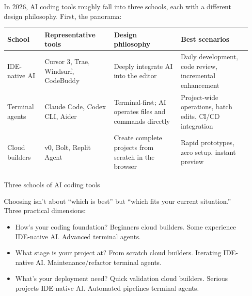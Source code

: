 


In 2026, AI coding tools roughly fall into three schools, each with a different design philosophy. First, the panorama:

\begin{center}
\begin{tabularx}{\linewidth}{|X|X|X|X|}
\hline
\textbf{School} & \textbf{Representative tools} & \textbf{Design philosophy} & \textbf{Best scenarios} \tabularnewline
\hline
IDE-native AI & Cursor 3, Trae, Windsurf, CodeBuddy & Deeply integrate AI into the editor & Daily development, code review, incremental enhancement \tabularnewline
Terminal agents & Claude Code, Codex CLI, Aider & Terminal-first; AI operates files and commands directly & Project-wide operations, batch edits, CI/CD integration \tabularnewline
Cloud builders & v0, Bolt, Replit Agent & Create complete projects from scratch in the browser & Rapid prototypes, zero setup, instant preview \tabularnewline
\hline
\end{tabularx}
\end{center}

\begin{center}\small\color{gray}Three schools of AI coding tools\end{center}

Choosing isn't about “which is best” but “which fits your current situation.” Three practical dimensions:

\begin{itemize}
  \item How's your coding foundation? Beginners cloud builders. Some experience IDE-native AI. Advanced terminal agents.
  \item What stage is your project at? From scratch cloud builders. Iterating IDE-native AI. Maintenance/refactor terminal agents.
  \item What's your deployment need? Quick validation cloud builders. Serious projects IDE-native AI. Automated pipelines terminal agents.
\end{itemize}


